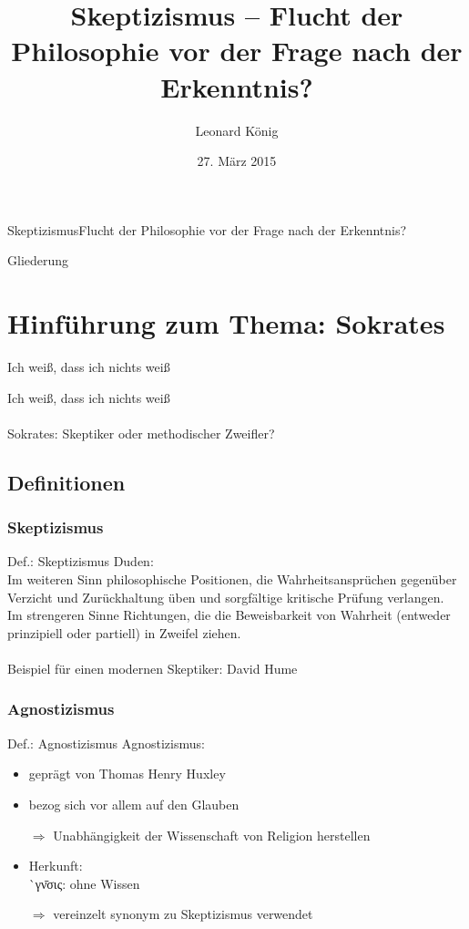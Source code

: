 \documentclass[12pt]{beamer}
\author{Leonard König}
\title[Skeptizismus]{Skeptizismus – Flucht der Philosophie vor der Frage nach der Erkenntnis?}
\institute{Herder-Gymnasium}
\date{27. März 2015}
\begin{document}
\begin{frame}{Skeptizismus}{Flucht der Philosophie vor der Frage nach der Erkenntnis?}
\titlepage
\end{frame}

\begin{frame}{Gliederung}
\tableofcontents
\end{frame}


\section{Hinführung zum Thema: Sokrates}
\begin{frame}{\glqq Ich weiß, dass ich nichts weiß\grqq}
\begin{center}
\glqq Ich weiß, dass ich nichts weiß\grqq\\
\ \\
Sokrates: Skeptiker oder methodischer Zweifler?
\end{center}
\end{frame}

\subsection{Definitionen}
\subsubsection{Skeptizismus}
\begin{frame}{Def.: Skeptizismus}
Duden:\\
\glqq Im weiteren Sinn philosophische Positionen, die Wahrheitsansprüchen gegenüber Verzicht und Zurückhaltung üben und sorgfältige kritische Prüfung verlangen.\\
Im strengeren Sinne Richtungen, die die Beweisbarkeit von Wahrheit (entweder prinzipiell oder partiell) in Zweifel ziehen.\grqq\\
\ \\
Beispiel für einen modernen Skeptiker: David Hume
\end{frame}		

\subsubsection{Agnostizismus}
\begin{frame}{Def.: Agnostizismus}
Agnostizismus:
\begin{itemize}
\item geprägt von Thomas Henry Huxley
\item bezog sich vor allem auf den Glauben
\item[$\Rightarrow$] Unabhängigkeit der Wissenschaft von Religion herstellen
\item Herkunft: \\
{\`{\textalpha}γν\={\textomega}σις}: \glqq ohne Wissen\grqq\
\item[$\Rightarrow$] vereinzelt synonym zu Skeptizismus verwendet
\end{itemize}
\end{frame}
\end{document}
